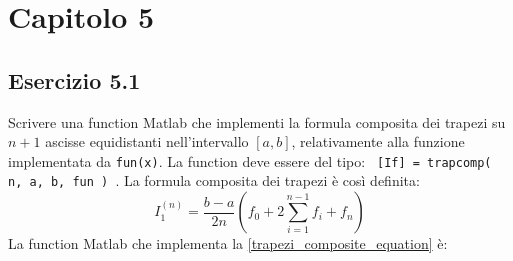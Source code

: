 \section{Capitolo 5}

	\subsection{Esercizio 5.1}
Scrivere una function Matlab che implementi la formula composita dei trapezi su $n+1$ ascisse equidistanti nell'intervallo $[a, b]$, relativamente alla funzione implementata da \texttt{fun(x)}. 
La function deve essere del tipo: \texttt{ [If] = trapcomp( n, a, b, fun ) }.
La formula composita dei trapezi è così definita:
\begin{equation}\label{trapezi_composite_equation}
	I_1^{(n)} = \frac{b-a}{2n} (f_0 + 2\sum_{i=1}^{n-1}f_i + f_n)
\end{equation}
La function Matlab che implementa la \ref{trapezi_composite_equation} è:


